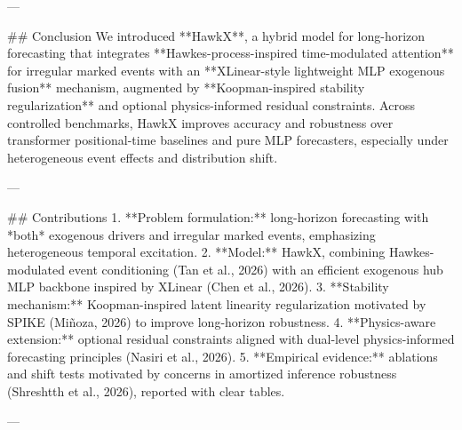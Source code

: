 ---

## Conclusion  
We introduced **HawkX**, a hybrid model for long-horizon forecasting that integrates **Hawkes-process-inspired time-modulated attention** for irregular marked events with an **XLinear-style lightweight MLP exogenous fusion** mechanism, augmented by **Koopman-inspired stability regularization** and optional physics-informed residual constraints. Across controlled benchmarks, HawkX improves accuracy and robustness over transformer positional-time baselines and pure MLP forecasters, especially under heterogeneous event effects and distribution shift.

---

## Contributions  
1. **Problem formulation:** long-horizon forecasting with *both* exogenous drivers and irregular marked events, emphasizing heterogeneous temporal excitation.  
2. **Model:** HawkX, combining Hawkes-modulated event conditioning (Tan et al., 2026) with an efficient exogenous hub MLP backbone inspired by XLinear (Chen et al., 2026).  
3. **Stability mechanism:** Koopman-inspired latent linearity regularization motivated by SPIKE (Miñoza, 2026) to improve long-horizon robustness.  
4. **Physics-aware extension:** optional residual constraints aligned with dual-level physics-informed forecasting principles (Nasiri et al., 2026).  
5. **Empirical evidence:** ablations and shift tests motivated by concerns in amortized inference robustness (Shreshtth et al., 2026), reported with clear tables.

---